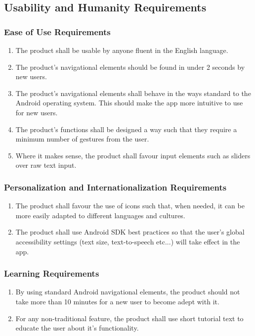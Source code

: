 \documentclass[]{article}
\begin{document}

\subsection{Usability and Humanity Requirements}
\label{sub:usability_and_humanity_requirements}

\subsubsection{Ease of Use Requirements}
\label{ssub:ease_of_use_requirements}
\begin{enumerate}[{UH}1. ]
	\item The product shall be usable by anyone fluent in the English language.
	\item The product's navigational elements should be found in under 2 seconds by new users.
	\item The product's navigational elements shall behave in the ways standard to the Android operating system. This should make the app more intuitive to use for new users. 
	\item The product's functions shall be designed a way such that they require a minimum number of gestures from the user.
	\item Where it makes sense, the product shall favour input elements such as sliders over raw text input.
	\holdEnum
\end{enumerate}

\subsubsection{Personalization and Internationalization Requirements}
\label{ssub:personalization_and_internationalization_requirements}
\begin{enumerate}[{UH}1. ]
	\resumeEnum
	\item The product shall favour the use of icons such that, when needed, it can be more easily adapted to different languages and cultures.
	\item The product shall use Android SDK best practices so that the user's global accessibility settings (text size, text-to-speech etc...) will take effect in the app. 
	\holdEnum
\end{enumerate}

\subsubsection{Learning Requirements}
\label{ssub:learning_requirements}
\begin{enumerate}[{UH}1. ]
	\resumeEnum
	\item By using standard Android navigational elements, the product should not take more than 10 minutes for a new user to become adept with it.
	\item For any non-traditional feature, the product shall use short tutorial text to educate the user about it's functionality.
	\holdEnum
\end{enumerate}
\end{document}
